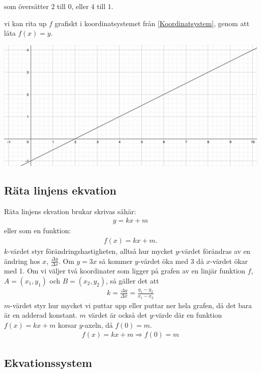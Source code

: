 som översätter $2$ till $0$, eller $4$ till $1$.

vi kan rita up $f$ grafiskt i koordinatsystemet från \ref{Koordinatsystem}, genom att låta $f(x) = y$.

\includegraphics[width=\textwidth]{img/2.png}

\newpage
\subsection{Räta linjens ekvation}

Räta linjens ekvation brukar skrivas såhär:
\begin{align}
	y=kx+m
\end{align}
eller som en funktion:
\begin{align}
	f(x)=kx+m.
\end{align}
$k$-värdet styr förändringshastigheten, alltså hur mycket $y$-värdet förändras av en ändring hos $x$, $\frac{\Delta y}{\Delta x}$. Om $y = 3x$ så kommer $y$-värdet öka med $3$ då $x$-värdet ökar med 1. Om vi väljer två koordinater som ligger på grafen av en linjär funktion $f$, $A=(x_1,y_1)$ och $B=(x_2,y_2)$, så gäller det att
\begin{align}
	k = \frac{\Delta y}{\Delta x} = \frac{y_1-y_2}{x_1-x_2}
\end{align}
$m$-värdet styr hur mycket vi puttar upp eller puttar ner hela grafen, då det bara är en adderad konstant. $m$ värdet är också det $y$-värde där en funktion $f(x)=kx+m$ korsar $y$-axeln, då $f(0)=m$.
\begin{align*}
	f(x) = kx+m \Rightarrow f(0) = m
\end{align*}

\newpage
\subsection{Ekvationssystem}

